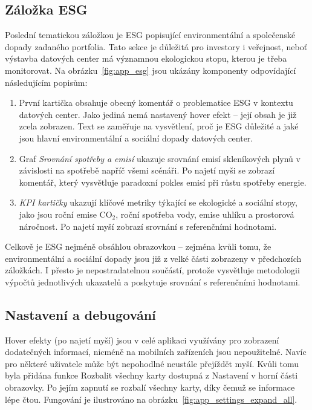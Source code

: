 \subsection{Záložka ESG}
\label{subsec:app_ui_esg}

Poslední tematickou záložkou je ESG popisující environmentální a společenské dopady zadaného portfolia. Tato sekce je důležitá pro investory i veřejnost, neboť výstavba datových center má významnou ekologickou stopu, kterou je třeba monitorovat. Na obrázku~\ref{fig:app_esg} jsou ukázány komponenty odpovídající následujícím popisům:

\begin{enumerate}
	
	\item První kartička obsahuje obecný komentář o problematice ESG v kontextu datových center. Jako jediná nemá nastavený hover efekt -- její obsah je již zcela zobrazen. Text se zaměřuje na vysvětlení, proč je ESG důležité a jaké jsou hlavní environmentální a sociální dopady datových center.
	
	\item Graf \textit{Srovnání spotřeby a emisí} ukazuje srovnání emisí skleníkových plynů v závislosti na spotřebě napříč všemi scénáři. Po najetí myši se zobrazí komentář, který vysvětluje paradoxní pokles emisí při růstu spotřeby energie.
	
	\item \textit{KPI kartičky} ukazují klíčové metriky týkající se ekologické a sociální stopy, jako jsou roční emise CO$_2$, roční spotřeba vody, emise uhlíku a prostorová náročnost. Po najetí myší zobrazí srovnání s referenčními hodnotami.

\end{enumerate}

Celkově je ESG nejméně obsáhlou obrazovkou -- zejména kvůli tomu, že environmentální a sociální dopady jsou již z velké části zobrazeny v předchozích záložkách. I přesto je nepostradatelnou součástí, protože vysvětluje metodologii výpočtů jednotlivých ukazatelů a poskytuje srovnání s referenčními hodnotami.

\subsection{Nastavení a debugování}
\label{subsec:app_ui_settings}
Hover efekty (po najetí myší) jsou v celé aplikaci využívány pro zobrazení dodatečných informací, nicméně na mobilních zařízeních jsou nepoužitelné. Navíc pro některé uživatele může být nepohodlné neustále přejíždět myší. Kvůli tomu byla přidána funkce Rozbalit všechny karty dostupná z Nastavení v horní části obrazovky. Po jejím zapnutí se rozbalí všechny karty, díky čemuž se informace lépe čtou. Fungování je ilustrováno na obrázku~\ref{fig:app_settings_expand_all}.

